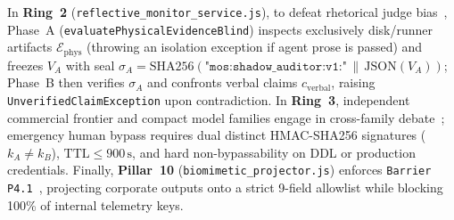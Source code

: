 \documentclass[10pt,twocolumn]{article}
\begin{document}
In \textbf{Ring~2} (\texttt{reflective\_monitor\_service.js}), to defeat rhetorical judge bias~\cite{E28}, Phase~A (\texttt{evaluatePhysicalEvidenceBlind}) inspects exclusively disk/runner artifacts $\mathcal{E}_{\mathrm{phys}}$ (throwing an isolation exception if agent prose is passed) and freezes $V_A$ with seal $\sigma_A = \mathrm{SHA256}(\texttt{"mos:shadow\_auditor:v1:"} \,\|\, \mathrm{JSON}(V_A))$; Phase~B then verifies $\sigma_A$ and confronts verbal claims $c_{\mathrm{verbal}}$, raising \texttt{UnverifiedClaimException} upon contradiction. In \textbf{Ring~3}, independent commercial frontier and compact model families engage in cross-family debate~\cite{E31,E32}; emergency human bypass requires dual distinct HMAC-SHA256 signatures ($k_A \neq k_B$), $\mathrm{TTL} \le 900\,\mathrm{s}$, and hard non-bypassability on DDL or production credentials. Finally, \textbf{Pillar~10} (\texttt{biomimetic\_projector.js}) enforces \texttt{Barrier P4.1}~\cite{E21,N01}, projecting corporate outputs onto a strict 9-field allowlist while blocking 100\% of internal telemetry keys.
\end{document}
